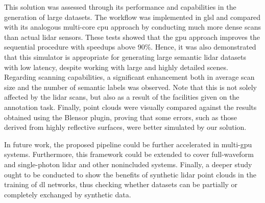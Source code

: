 This solution was assessed through its performance and capabilities in the generation of large datasets. The workflow was implemented in \acrshort{glsl} and compared with its analogous multi-core \acrshort{cpu} approach by conducting much more dense scans than actual \acrshort{lidar} sensors. These tests showed that the \acrshort{gpu} approach improves the sequential procedure with speedups above 90\%. Hence, it was also demonstrated that this simulator is appropriate for generating large semantic \acrshort{lidar} datasets with low latency, despite working with large and highly detailed scenes. Regarding scanning capabilities, a significant enhancement both in average scan size and the number of semantic labels was observed. Note that this is not solely affected by the \acrshort{lidar} scans, but also as a result of the facilities given on the annotation task. Finally, point clouds were visually compared against the results obtained using the Blensor plugin, proving that some errors, such as those derived from highly reflective surfaces, were better simulated by our solution. 

In future work, the proposed pipeline could be further accelerated in multi-\acrshort{gpu} systems. Furthermore, this framework could be extended to cover full-waveform and single-photon \acrshort{lidar} \cite{tachella_real-time_2019} and other nonincluded systems. Finally, a deeper study ought to be conducted to show the benefits of synthetic \acrshort{lidar} point clouds in the training of \acrshort{dl} networks, thus checking whether datasets can be partially or completely exchanged by synthetic data. 